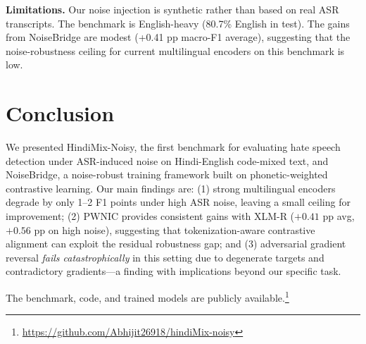 \documentclass[conference]{IEEEtran}
\begin{document}
\textbf{Limitations.} Our noise injection is synthetic rather than based on real ASR transcripts. The benchmark is English-heavy (80.7\% English in test). The gains from NoiseBridge are modest (+0.41 pp macro-F1 average), suggesting that the noise-robustness ceiling for current multilingual encoders on this benchmark is low.


\section{Conclusion}
\label{sec:conclusion}

We presented HindiMix-Noisy, the first benchmark for evaluating hate speech detection under ASR-induced noise on Hindi-English code-mixed text, and NoiseBridge, a noise-robust training framework built on phonetic-weighted contrastive learning. Our main findings are: (1) strong multilingual encoders degrade by only 1--2 F1 points under high ASR noise, leaving a small ceiling for improvement; (2) PWNIC provides consistent gains with XLM-R ($+0.41$ pp avg, $+0.56$ pp on high noise), suggesting that tokenization-aware contrastive alignment can exploit the residual robustness gap; and (3) adversarial gradient reversal \textit{fails catastrophically} in this setting due to degenerate targets and contradictory gradients---a finding with implications beyond our specific task.

The benchmark, code, and trained models are publicly available.\footnote{\url{https://github.com/Abhijit26918/hindiMix-noisy}}


\end{document}
